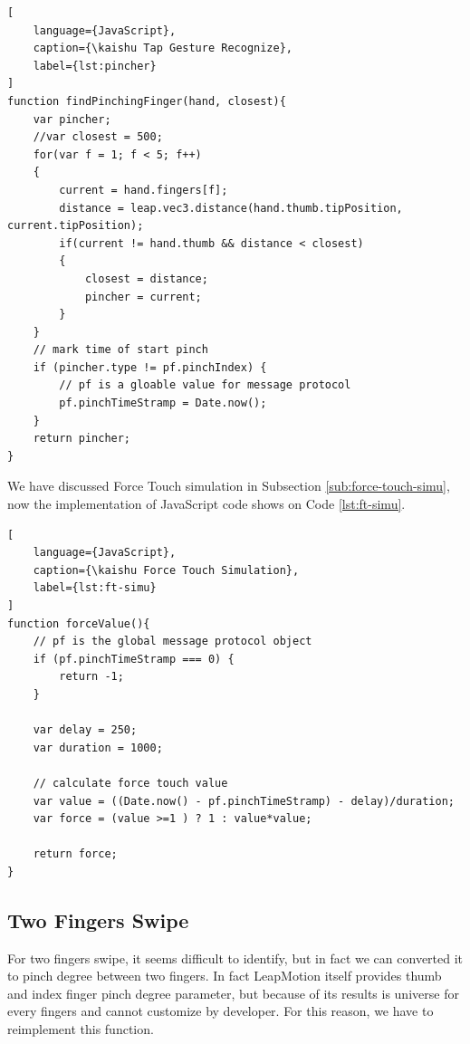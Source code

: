 \begin{lstlisting}[
    language={JavaScript},
    caption={\kaishu Tap Gesture Recognize},
    label={lst:pincher}
]
function findPinchingFinger(hand, closest){
    var pincher;
    //var closest = 500;
    for(var f = 1; f < 5; f++)
    {
        current = hand.fingers[f];
        distance = leap.vec3.distance(hand.thumb.tipPosition, current.tipPosition);
        if(current != hand.thumb && distance < closest)
        {
            closest = distance;
            pincher = current;
        }
    }
    // mark time of start pinch
    if (pincher.type != pf.pinchIndex) {
        // pf is a gloable value for message protocol
        pf.pinchTimeStramp = Date.now();
    }
    return pincher;
}
\end{lstlisting}

We have discussed Force Touch simulation in Subsection \ref{sub:force-touch-simu}, now the implementation of JavaScript code shows on Code \ref{lst:ft-simu}.

\begin{lstlisting}[
    language={JavaScript},
    caption={\kaishu Force Touch Simulation},
    label={lst:ft-simu}
]
function forceValue(){
    // pf is the global message protocol object
    if (pf.pinchTimeStramp === 0) {
        return -1;
    }

    var delay = 250;
    var duration = 1000;

    // calculate force touch value
    var value = ((Date.now() - pf.pinchTimeStramp) - delay)/duration;
    var force = (value >=1 ) ? 1 : value*value;

    return force;
}
\end{lstlisting}

\subsection{Two Fingers Swipe}

For two fingers swipe, it seems difficult to identify, but in fact we can converted it to pinch degree between two fingers.
In fact LeapMotion itself provides thumb and index finger pinch degree parameter, but because of its results is universe for every fingers and cannot customize by developer. For this reason, we have to reimplement this function.

